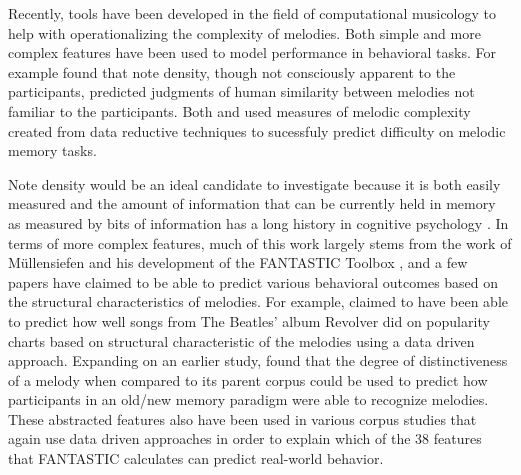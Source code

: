 \documentclass[12pt,]{book}
\begin{document}
Recently, tools have been developed in the field of computational musicology to help with operationalizing the complexity of melodies.
Both simple and more complex features have been used to model performance in behavioral tasks.
For example \citet{eerolaPerceivedComplexityWestern2006} found that note density, though not consciously apparent to the participants, predicted judgments of human similarity between melodies not familiar to the participants.
Both \citet{harrisonModellingMelodicDiscrimination2016} and \citet{bakerPerceptionLeitmotivesRichard2017} used measures of melodic complexity created from data reductive techniques to sucessfuly predict difficulty on melodic memory tasks.

Note density would be an ideal candidate to investigate because it is both easily measured and the amount of information that can be currently held in memory as measured by bits of information has a long history in cognitive psychology \citep{cowanWorkingMemoryCapacity2005, millerInformationMemory1956, pearceStatisticalLearningProbabilistic2018a}.
In terms of more complex features, much of this work largely stems from the work of Müllensiefen and his development of the FANTASTIC Toolbox \citeyearpar{mullensiefenFantasticFeatureANalysis2009}, and a few papers have claimed to be able to predict various behavioral outcomes based on the structural characteristics of melodies.
For example, \citep{kopiezAufSucheNach2011} claimed to have been able to predict how well songs from The Beatles' album Revolver did on popularity charts based on structural characteristic of the melodies using a data driven approach.
Expanding on an earlier study, \citep{mullensiefenRoleFeaturesContext2014} found that the degree of distinctiveness of a melody when compared to its parent corpus could be used to predict how participants in an old/new memory paradigm were able to recognize melodies.
These abstracted features also have been used in various corpus studies \citep{jakubowskiDissectingEarwormMelodic2017, janssenPredictingVariationFolk2017, rainsfordDistinctivenessEffectRecognition2019, rainsfordMUSOSMUsicSOftware2018}
that again use data driven approaches in order to explain which of the 38 features that FANTASTIC calculates can predict real-world behavior.
\end{document}
